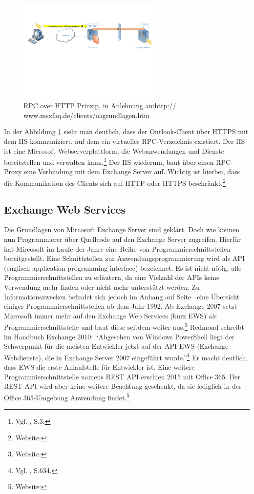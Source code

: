 \begin{figure}[h!]
\centering
\includegraphics[width=0.65\textwidth]{Abbildungen/RPC_HTTP}
	\caption[RPC over HTTP Prinzip]{RPC over HTTP Prinzip,  in Anlehnung an:http://
	www.msxfaq.de/clients/oagrundlagen.htm}
	\label{fig:RPC_HTTP}
\end{figure}

\noindent
In der Abbildung \ref{fig:RPC_HTTP} sieht man deutlich, dass der Outlook-Client über HTTPS mit dem IIS kommuniziert, auf dem ein virtuelles RPC-Verzeichnis existiert. Der IIS ist eine Microsoft-Webserverplattform, die Webanwendungen und Dienste bereitstellen und verwalten kann.\footnote{Vgl. \citeauthor{Volodarsky} \citeyear{Volodarsky}, S.3.} Der IIS wiederum, baut über einen RPC-Proxy eine Verbindung mit dem Exchange Server auf. Wichtig ist hierbei, dass die Kommunikation des Clients sich auf HTTP oder HTTPS beschränkt.\footnote{Website:\cite{MSXoutlook}}


\subsection{Exchange Web Services}
\noindent
Die Grundlagen von Mircosoft Exchange Server sind geklärt. Doch wie können nun Programmierer über Quellcode auf den Exchange Server zugreifen. Hierfür hat Mircosoft im Laufe der Jahre eine Reihe von Programmierschnittstellen bereitgestellt. Eine Schnittstellen zur Anwendungsprogrammierung wird als API (englisch application programming interface) bezeichnet. Es ist nicht nötig, alle Programmierschnittstellen zu erläutern, da eine Vielzahl der APIs keine Verwendung mehr finden oder nicht mehr unterstützt werden. Zu Informationszwecken befindet sich jedoch im Anhang auf Seite~\pageref{API_1} eine Übersicht einiger Programmierschnittstellen ab dem Jahr 1992. Ab Exchange 2007 setzt Microsoft immer mehr auf den Exchange Web Services (kurz EWS) als Programmierschnittstelle und baut diese seitdem weiter aus.\footnote{Website:\cite{MSXews}}
Redmond schreibt im Handbuch Exchange 2010: 
\enquote{Abgesehen von Windows PowerShell liegt der Schwerpunkt für die meisten Entwickler jetzt auf der API EWS (Exchange-Webdienste), die in Exchange Server 2007 eingeführt wurde.}\footnote{Vgl. \citeauthor{Redmond} \citeyear{Redmond}, S.634.}
Er macht deutlich, dass EWS die erste Anlaufstelle für Entwickler ist. Eine weitere Programmierschnittstelle namens REST API erschien 2015 mit Office 365. Der REST API wird aber keine weitere Beachtung geschenkt, da sie lediglich in der Office 365-Umgebung Anwendung findet.\footnote{Website:\cite{MicrosoftAPI}}


